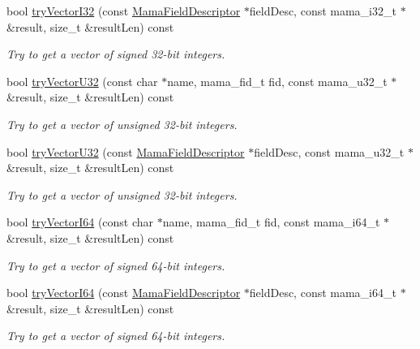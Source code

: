 \begin{DoxyCompactItemize}
bool \hyperlink{classWombat_1_1MamaMsg_ae764d0d314b85be7270738fcd7715fe7}{tryVectorI32} (const \hyperlink{classWombat_1_1MamaFieldDescriptor}{MamaFieldDescriptor} $\ast$fieldDesc, const mama\_\-i32\_\-t $\ast$\&result, size\_\-t \&resultLen) const 
\begin{DoxyCompactList}\small\item\em Try to get a vector of signed 32-\/bit integers. \item\end{DoxyCompactList}\item 
bool \hyperlink{classWombat_1_1MamaMsg_a2b74035c93d667e19ca56bb1eddd85dd}{tryVectorU32} (const char $\ast$name, mama\_\-fid\_\-t fid, const mama\_\-u32\_\-t $\ast$\&result, size\_\-t \&resultLen) const 
\begin{DoxyCompactList}\small\item\em Try to get a vector of unsigned 32-\/bit integers. \item\end{DoxyCompactList}\item 
bool \hyperlink{classWombat_1_1MamaMsg_a3fc07cd71a28123e180fcda7d48da22e}{tryVectorU32} (const \hyperlink{classWombat_1_1MamaFieldDescriptor}{MamaFieldDescriptor} $\ast$fieldDesc, const mama\_\-u32\_\-t $\ast$\&result, size\_\-t \&resultLen) const 
\begin{DoxyCompactList}\small\item\em Try to get a vector of unsigned 32-\/bit integers. \item\end{DoxyCompactList}\item 
bool \hyperlink{classWombat_1_1MamaMsg_ad50df98109596b72c97e4dcaaf91ad65}{tryVectorI64} (const char $\ast$name, mama\_\-fid\_\-t fid, const mama\_\-i64\_\-t $\ast$\&result, size\_\-t \&resultLen) const 
\begin{DoxyCompactList}\small\item\em Try to get a vector of signed 64-\/bit integers. \item\end{DoxyCompactList}\item 
bool \hyperlink{classWombat_1_1MamaMsg_a51e2f41dc663dce50ee2001673fe55e5}{tryVectorI64} (const \hyperlink{classWombat_1_1MamaFieldDescriptor}{MamaFieldDescriptor} $\ast$fieldDesc, const mama\_\-i64\_\-t $\ast$\&result, size\_\-t \&resultLen) const 
\begin{DoxyCompactList}\small\item\em Try to get a vector of signed 64-\/bit integers. \item\end{DoxyCompactList}\item 

\end{DoxyCompactItemize}

